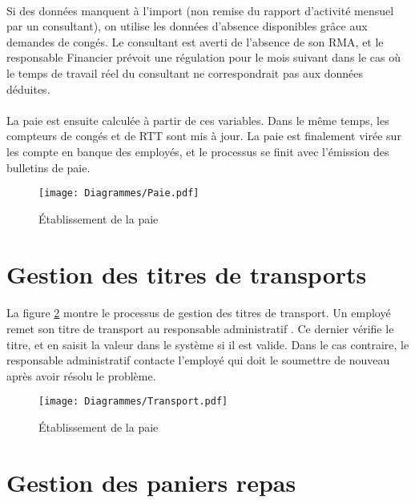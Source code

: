 \paragraph{} Si des données manquent à l'import (non remise du rapport d'activité mensuel par un consultant), on utilise les données d'absence disponibles grâce aux demandes de congés. Le consultant est averti de l'absence de son RMA, et le responsable Financier prévoit une régulation pour le mois suivant dans le cas où le temps de travail réel du consultant ne correspondrait pas aux données déduites.

\paragraph{} La paie est ensuite calculée à partir de ces variables. Dans le même temps, les compteurs de congés et de RTT sont mis à jour. La paie est finalement virée sur les compte en banque des employés, et le processus se finit avec l'émission des bulletins de paie.

\begin{figure}[H]
\centering
\begin{sideways}
	\texttt{[image: Diagrammes/Paie.pdf]}
\end{sideways}
	\caption{Établissement de la paie} 
	\label{paie}
\end{figure}


\section{Gestion des titres de transports}

\paragraph{} La figure \ref{transports} montre le processus de gestion des titres de transport. Un employé remet son titre de transport au responsable administratif . Ce dernier vérifie le titre, et en saisit la valeur dans le système si il est valide. Dans le cas contraire, le responsable administratif contacte l'employé qui doit le soumettre de nouveau après avoir résolu le problème.

\begin{figure}[H]
\centering
	\texttt{[image: Diagrammes/Transport.pdf]}
	\caption{Établissement de la paie} 
	\label{transports}
\end{figure}

\section{Gestion des paniers repas}
